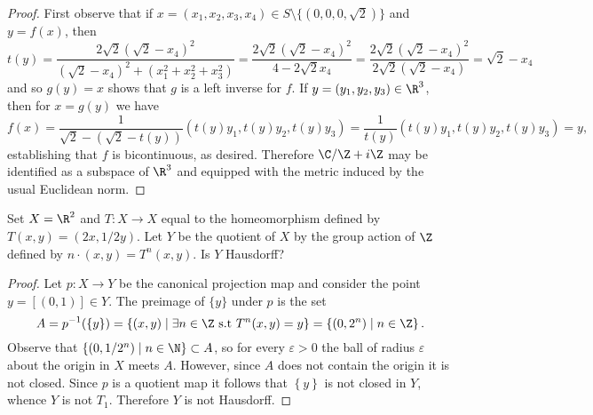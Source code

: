 \documentclass[10pt]{amsart}
\begin{document}
\begin{thm}
\begin{proof}
    First observe that if $x = (x_1, x_2, x_3, x_4) \in S \setminus \{(0,0,0,\sqrt{2})\}$ and $y = f(x)$, then
    $$t(y) = \frac{2\sqrt{2}(\sqrt{2} - x_4)^2}{(\sqrt{2} - x_4)^2 + (x_1^2 + x_2^2 + x_3^2)} = \frac{2\sqrt{2}(\sqrt{2} - x_4)^2}{4 - 2\sqrt{2}x_4} = \frac{2\sqrt{2}(\sqrt{2} - x_4)^2}{2\sqrt{2}(\sqrt{2} -x_4)} = \sqrt{2} - x_4$$
    and so $g(y) = x$ shows that $g$ is a left inverse for $f$.
    If $y = (y_1, y_2, y_3) \in \R^3$, then for $x = g(y)$ we have
    $$f(x) = \frac{1}{\sqrt{2} - (\sqrt{2} - t(y))}(t(y)y_1, t(y)y_2, t(y)y_3) = \frac{1}{t(y)}(t(y)y_1, t(y)y_2, t(y)y_3) = y,$$
    establishing that $f$ is bicontinuous, as desired.
    Therefore $\C/\Z +i\Z$ may be identified as a subspace of $\R^3$ and equipped with the metric induced by the usual Euclidean norm.		
  \end{proof}
\end{thm}

\begin{thm}\label{ex3}
  Set $X = \R^2$ and $T \colon X \rightarrow X$ equal to the homeomorphism defined by $T(x,y) = (2x, 1/2y)$.
  Let $Y$ be the quotient of $X$ by the group action of $\Z$ defined by $n \cdot (x,y) = T^n(x,y)$.
  Is $Y$ Hausdorff?
  
  \begin{proof}
    Let $p \colon X \rightarrow Y$ be the canonical projection map and consider the point $y = [(0,1)] \in Y$.
    The preimage of $\{y\}$ under $p$ is the set
    $$A = p^{-1}(\{y\}) = \left\{(x,y) \;\middle\vert\; \exists n \in \Z\ \text{s.t}\ T^{n}(x,y) = y\right\} = \left\{(0, 2^{n}) \;\middle\vert\; n \in \Z\right\}.$$
    Observe that $\left\{(0, 1/2^n) \;\middle\vert\; n \in \N \right\} \subset A$, so for every $\varepsilon > 0$ the ball of radius $\varepsilon$ about the origin in $X$ meets $A$.
    However, since $A$ does not contain the origin it is not closed.
    Since $p$ is a quotient map it follows that $\left\{y\right\}$ is not closed in $Y$, whence $Y$ is not $T_1$.
    Therefore $Y$ is not Hausdorff.
  \end{proof}
\end{thm}
\end{document}
